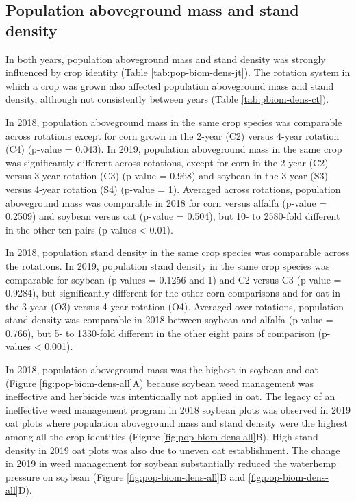 \documentclass[utf8]{frontiersSCNS}
\begin{document}
\hypertarget{population-aboveground-mass-and-stand-density}{%
\subsection*{Population aboveground mass and stand density}\label{population-aboveground-mass-and-stand-density}}

In both years, population aboveground mass and stand density was strongly influenced by crop identity (Table \ref{tab:pop-biom-dens-jt}). The rotation system in which a crop was grown also affected population aboveground mass and stand density, although not consistently between years (Table \ref{tab:pbiom-dens-ct}).

In 2018, population aboveground mass in the same crop species was comparable across rotations except for corn grown in the 2-year (C2) versus 4-year rotation (C4) (p-value = 0.043). In 2019, population aboveground mass in the same crop was significantly different across rotations, except for corn in the 2-year (C2) versus 3-year rotation (C3) (p-value = 0.968) and soybean in the 3-year (S3) versus 4-year rotation (S4) (p-value = 1). Averaged across rotations, population aboveground mass was comparable in 2018 for corn versus alfalfa (p-value = 0.2509) and soybean versus oat (p-value = 0.504), but 10- to 2580-fold different in the other ten pairs (p-values \textless{} 0.01).

In 2018, population stand density in the same crop species was comparable across the rotations. In 2019, population stand density in the same crop species was comparable for soybean (p-values = 0.1256 and 1) and C2 versus C3 (p-value = 0.9284), but significantly different for the other corn comparisons and for oat in the 3-year (O3) versus 4-year rotation (O4). Averaged over rotations, population stand density was comparable in 2018 between soybean and alfalfa (p-value = 0.766), but 5- to 1330-fold different in the other eight pairs of comparison (p-values \textless{} 0.001).

In 2018, population aboveground mass was the highest in soybean and oat (Figure \ref{fig:pop-biom-dens-all}A) because soybean weed management was ineffective and herbicide was intentionally not applied in oat. The legacy of an ineffective weed management program in 2018 soybean plots was observed in 2019 oat plots where population aboveground mass and stand density were the highest among all the crop identities (Figure \ref{fig:pop-biom-dens-all}B). High stand density in 2019 oat plots was also due to uneven oat establishment. The change in 2019 in weed management for soybean substantially reduced the waterhemp pressure on soybean (Figure \ref{fig:pop-biom-dens-all}B and \ref{fig:pop-biom-dens-all}D).
\end{document}
